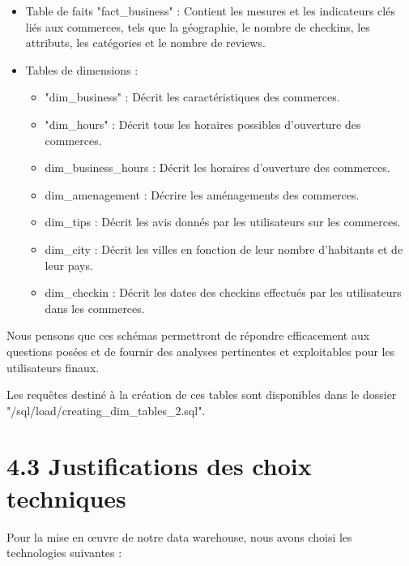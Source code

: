 \begin{itemize}
\item Table de faits "fact_business" : Contient les mesures et les indicateurs clés liés aux commerces, tels que la géographie, le nombre de checkins, les attributs, les catégories et le nombre de reviews.

\item Tables de dimensions :
\begin{itemize}
\item "dim_business" : Décrit les caractéristiques des commerces.
\item "dim_hours" : Décrit tous les horaires possibles d'ouverture des commerces.
\item dim_business_hours : Décrit les horaires d'ouverture des commerces.
\item dim_amenagement : Décrire les aménagements des commerces.
\item dim_tips : Décrit les avis donnés par les utilisateurs sur les commerces.
\item dim_city : Décrit les villes en fonction de leur nombre d'habitants et de leur pays.
\item dim_checkin : Décrit les dates des checkins effectués par les utilisateurs dans les commerces.
\end{itemize}

\end{itemize}

Nous pensons que ces schémas permettront de répondre efficacement aux questions posées et de fournir des analyses pertinentes et exploitables pour les utilisateurs finaux.

Les requêtes destiné à la création de ces tables sont disponibles dans le dossier "/sql/load/creating_dim_tables_2.sql".


\section*{4.3 Justifications des choix techniques}

Pour la mise en œuvre de notre data warehouse, nous avons choisi les technologies suivantes :

